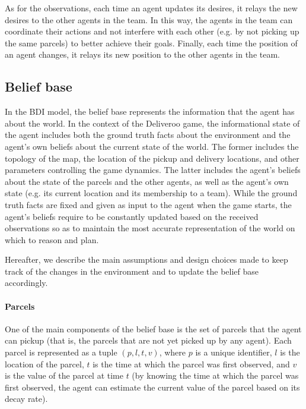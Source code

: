 As for the observations, each time an agent updates its desires, it relays the new desires to the other agents in the team. In this way, the agents in the team can coordinate their actions and not interfere with each other (e.g. by not picking up the same parcels) to better achieve their goals. Finally, each time the position of an agent changes, it relays its new position to the other agents in the team.


\subsection{Belief base}
\label{sec:belief-base}

In the BDI model, the belief base represents the information that the agent has about the world. In the context of the Deliveroo game, the informational state of the agent includes both the ground truth facts about the environment and the agent's own beliefs about the current state of the world. The former includes the topology of the map, the location of the pickup and delivery locations, and other parameters controlling the game dynamics. The latter includes the agent's beliefs about the state of the parcels and the other agents, as well as the agent's own state (e.g. its current location and its membership to a team). While the ground truth facts are fixed and given as input to the agent when the game starts, the agent's beliefs require to be constantly updated based on the received observations so as to maintain the most accurate representation of the world on which to reason and plan.

Hereafter, we describe the main assumptions and design choices made to keep track of the changes in the environment and to update the belief base accordingly.

\paragraph*{Parcels}
One of the main components of the belief base is the set of parcels that the agent can pickup (that is, the parcels that are not yet picked up by any agent). Each parcel is represented as a tuple $(p, l, t, v)$, where $p$ is a unique identifier, $l$ is the location of the parcel, $t$ is the time at which the parcel was first observed, and $v$ is the value of the parcel at time $t$ (by knowing the time at which the parcel was first observed, the agent can estimate the current value of the parcel based on its decay rate).

